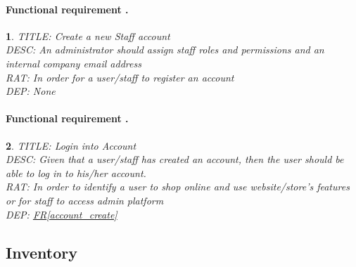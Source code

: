 \documentclass{scrreprt}
\theoremstyle{funreq}
\newtheorem{funreq}{}
\newcommand*{\reqref}[1]{\hyperref[#1]{FR\ref*{#1}}}
\begin{document}
\paragraph[]{Functional requirement .}
\begin{funreq}
	\label{account_createstaff}
	TITLE: Create a new Staff account\\
	DESC: An administrator should assign staff roles and permissions and an internal company email address\\
	RAT: In order for a user/staff to register an account\\
	DEP: None\\
\end{funreq}

\paragraph[]{Functional requirement .}
\begin{funreq}
	\label{account_login}
	TITLE: Login into Account\\
	DESC: Given that a user/staff has created an account, then the user should be able to log in to his/her account.\\
	RAT: In order to identify a user to shop online and use website/store’s features or for staff to access admin platform\\
	DEP: \reqref{account_create}
\end{funreq}

	\subsection{Inventory}
\end{document}
